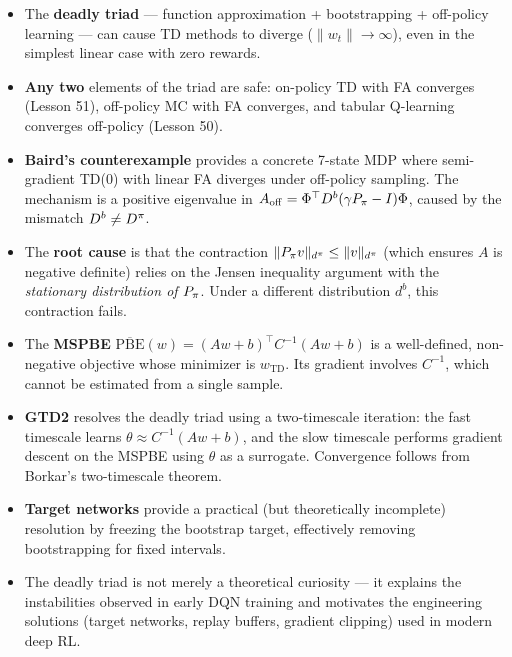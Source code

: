 \documentclass[11pt,a4paper]{article}
\begin{document}
\begin{itemize}
  \item The \textbf{deadly triad} --- function approximation +
    bootstrapping + off-policy learning --- can cause TD methods to
    diverge ($\|w_t\| \to \infty$), even in the simplest linear
    case with zero rewards.

  \item \textbf{Any two} elements of the triad are safe:
    on-policy TD with FA converges (Lesson 51), off-policy MC with FA
    converges, and tabular Q-learning converges off-policy (Lesson 50).

  \item \textbf{Baird's counterexample} provides a concrete 7-state
    MDP where semi-gradient TD(0) with linear FA diverges under
    off-policy sampling. The mechanism is a positive eigenvalue in
    $A_{\mathrm{off}} = \Phi^\top D^b(\gamma P_\pi - I)\Phi$,
    caused by the mismatch $D^b \neq D^\pi$.

  \item The \textbf{root cause} is that the contraction
    $\|P_\pi v\|_{d^\pi} \leq \|v\|_{d^\pi}$ (which
    ensures $A$ is negative definite) relies on the Jensen inequality
    argument with the \emph{stationary distribution of $P_\pi$}.
    Under a different distribution $d^b$, this contraction fails.

  \item The \textbf{MSPBE}
    $\overline{\mathrm{PBE}}(w)
    = (Aw+b)^\top C^{-1}(Aw+b)$ is a well-defined, non-negative
    objective whose minimizer is $w_{\mathrm{TD}}$. Its gradient
    involves $C^{-1}$, which cannot be estimated from a single sample.

  \item \textbf{GTD2} resolves the deadly triad using a two-timescale
    iteration: the fast timescale learns
    $\theta \approx C^{-1}(Aw+b)$, and the slow timescale performs
    gradient descent on the MSPBE using $\theta$ as a surrogate.
    Convergence follows from Borkar's two-timescale theorem.

  \item \textbf{Target networks} provide a practical (but theoretically
    incomplete) resolution by freezing the bootstrap target,
    effectively removing bootstrapping for fixed intervals.

  \item The deadly triad is not merely a theoretical curiosity --- it
    explains the instabilities observed in early DQN training and
    motivates the engineering solutions (target networks, replay
    buffers, gradient clipping) used in modern deep RL.
\end{itemize}
\end{document}

